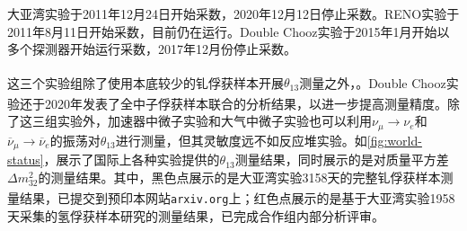 \documentclass[a4paper,zihao=-4]{article}
\newcommand{\citess}[1]{\textsuperscript{\cite{#1}}}
\begin{document}
大亚湾实验于2011年12月24日开始采数，2020年12月12日停止采数。RENO实验于2011年8月11日开始采数，目前仍在运行。Double Chooz实验于2015年1月开始以多个探测器开始运行采数，2017年12月份停止采数。

这三个实验组除了使用本底较少的钆俘获样本开展$\theta_{13}$测量\citess{DoubleChooz:2014kuw}之外，。Double Chooz实验还于2020年发表了全中子俘获样本联合的分析结果\citess{DoubleChooz:2019qbj}，以进一步提高测量精度。除了这三组实验外，加速器中微子实验和大气中微子实验也可以利用$\nu_\mu\to\nu_e$和$\overline{\nu}_\mu\to\overline{\nu}_e$的振荡对$\theta_{13}$进行测量，但其灵敏度远不如反应堆实验。如\cref{fig:world-status}，展示了国际上各种实验提供的$\theta_{13}$测量结果，同时展示的是对质量平方差$\Delta m_{32}^2$的测量结果。其中，黑色点展示的是大亚湾实验3158天的完整钆俘获样本测量结果\citess{DayaBay:2022orm}，已提交到预印本网站\texttt{arxiv.org}上；红色点展示的是基于大亚湾实验1958天采集的氢俘获样本研究的测量结果，已完成合作组内部分析评审。
\end{document}
